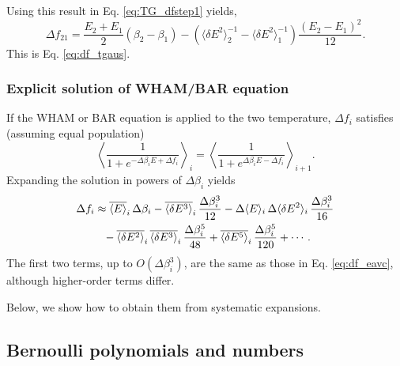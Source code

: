 \documentclass[aip,jcp,preprint,notitlepage, superscriptaddress]{revtex4-1}
\begin{document}
Using this result in Eq. \eqref{eq:TG_dfstep1} yields,
\begin{equation*}
\Delta f_{21}
=
\frac{ E_2 + E_1 } { 2 } (\beta_2 - \beta_1)
-
\left(
  \langle \delta E^2 \rangle_2^{-1}
  -
  \langle \delta E^2 \rangle_1^{-1}
\right)
\frac{ (E_2 - E_1)^2 }{ 12 }.
\end{equation*}
%
This is Eq. \eqref{eq:df_tgaus}.



\subsubsection{Explicit solution of WHAM/BAR equation}



If the WHAM or BAR equation
is applied to the two temperature,
$\Delta f_i$ satisfies
(assuming equal population)
%
\begin{equation*}
\left\langle
\frac{ 1 }
{ 1 + e^{-\Delta \beta_i E + \Delta f_i} }
\right\rangle_i
=
\left\langle
\frac{ 1 }
{ 1 + e^{\Delta \beta_i E - \Delta f_i} }
\right\rangle_{i+1}.
\end{equation*}
%
Expanding the solution
in powers of $\Delta \beta_i$
yields
\begin{align}
\Delta f_i
&
\approx
\overline{ \langle E \rangle }_i \, \Delta \beta_i
%
-\overline{ \langle \delta E^3 \rangle }_i
\, \frac{ \Delta \beta_i^3 } { 12 }
%
-\Delta \langle E \rangle_i
\, \Delta \langle \delta E^2 \rangle_i
\, \frac{ \Delta \beta_i^3 } { 16 }
\notag \\
&
\phantom{\approx}
%
-\overline{ \langle \delta E^2 \rangle }_i
\, \overline{ \langle \delta E^3 \rangle }_i
\, \frac{ \Delta \beta_i^5 } { 48 }
%
+\overline{ \langle \delta E^5 \rangle }_i
\, \frac{ \Delta \beta_i^5 } { 120 }
+ \cdots.
\notag
\end{align}
%
The first two terms, up to $O(\Delta \beta_i^3)$,
are the same as those in Eq. \eqref{eq:df_eavc},
although higher-order terms differ.
%





%
Below, we show how to obtain them from systematic expansions.







\subsection{Bernoulli polynomials and numbers}
\end{document}
